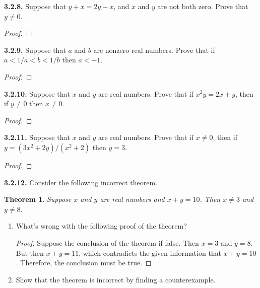 \documentclass[12pt]{amsart}
\newenvironment{statement}[1]{\smallskip\noindent\color[rgb]{.6627, .3529, .6314} {\bf #1.}}{}
\newtheorem{theorem}{Theorem}
\theoremstyle{definition}
\theoremstyle{remark}
\begin{document}
\begin{statement}{3.2.8}
Suppose that $y + x = 2y - x$, and $x$ and $y$ are not both zero.
Prove that $y \neq 0$.
\end{statement}

\begin{proof}
\end{proof}


\begin{statement}{3.2.9}
Suppose that $a$ and $b$ are nonzero real numbers.
Prove that if $a < 1/a < b < 1/b$ then $a < -1$.
\end{statement}

\begin{proof}
\end{proof}


\begin{statement}{3.2.10}
Suppose that $x$ and $y$ are real numbers.
Prove that if $x^2y = 2x + y$, then if $y \neq 0$ then $x \neq 0$.
\end{statement}

\begin{proof}
\end{proof}


\begin{statement}{3.2.11}
Suppose that $x$ and $y$ are real numbers.
Prove that if $x \neq 0$, then if $y = (3x^2 + 2y) / (x^2 + 2)$ then $y = 3$.
\end{statement}

\begin{proof}
\end{proof}


\begin{statement}{3.2.12}
Consider the following incorrect theorem.
\begin{theorem}
	Suppose $x$ and $y$ are real numbers and $x + y = 10$.
	Then $x \neq 3$ and $y \neq 8$.
\end{theorem}
\begin{enumerate}
	\item What's wrong with the following proof of the theorem?
	\begin{proof}
		Suppose the conclusion of the theorem if false.
		Then $x = 3$ and $y = 8$.
		But then $x + y = 11$, which contradicts the given information that $x + y = 10$.
		Therefore, the conclusion must be true.
	\end{proof}
	
	\item Show that the theorem is incorrect by finding a counterexample.
\end{enumerate}
\end{statement}
\end{document}
